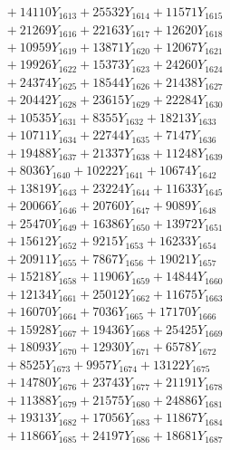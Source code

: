 \documentclass[a4paper,10pt]{article}
\begin{document}
{\begin{align}
&\;  + 14110 Y_{1613} + 25532 Y_{1614} + 11571 Y_{1615} \\[0.3ex]
&\;  + 21269 Y_{1616} + 22163 Y_{1617} + 12620 Y_{1618} \\[0.5ex]\allowbreak
&\;  + 10959 Y_{1619} + 13871 Y_{1620} + 12067 Y_{1621} \\[0.3ex]
&\;  + 19926 Y_{1622} + 15373 Y_{1623} + 24260 Y_{1624} \\[0.3ex]
&\;  + 24374 Y_{1625} + 18544 Y_{1626} + 21438 Y_{1627} \\[0.3ex]
&\;  + 20442 Y_{1628} + 23615 Y_{1629} + 22284 Y_{1630} \\[0.3ex]
&\;  + 10535 Y_{1631} + 8355 Y_{1632} + 18213 Y_{1633} \\[0.3ex]
&\;  + 10711 Y_{1634} + 22744 Y_{1635} + 7147 Y_{1636} \\[0.3ex]
&\;  + 19488 Y_{1637} + 21337 Y_{1638} + 11248 Y_{1639} \\[0.3ex]
&\;  + 8036 Y_{1640} + 10222 Y_{1641} + 10674 Y_{1642} \\[0.3ex]
&\;  + 13819 Y_{1643} + 23224 Y_{1644} + 11633 Y_{1645} \\[0.3ex]
&\;  + 20066 Y_{1646} + 20760 Y_{1647} + 9089 Y_{1648} \\[0.5ex]\allowbreak
&\;  + 25470 Y_{1649} + 16386 Y_{1650} + 13972 Y_{1651} \\[0.3ex]
&\;  + 15612 Y_{1652} + 9215 Y_{1653} + 16233 Y_{1654} \\[0.3ex]
&\;  + 20911 Y_{1655} + 7867 Y_{1656} + 19021 Y_{1657} \\[0.3ex]
&\;  + 15218 Y_{1658} + 11906 Y_{1659} + 14844 Y_{1660} \\[0.3ex]
&\;  + 12134 Y_{1661} + 25012 Y_{1662} + 11675 Y_{1663} \\[0.3ex]
&\;  + 16070 Y_{1664} + 7036 Y_{1665} + 17170 Y_{1666} \\[0.3ex]
&\;  + 15928 Y_{1667} + 19436 Y_{1668} + 25425 Y_{1669} \\[0.3ex]
&\;  + 18093 Y_{1670} + 12930 Y_{1671} + 6578 Y_{1672} \\[0.3ex]
&\;  + 8525 Y_{1673} + 9957 Y_{1674} + 13122 Y_{1675} \\[0.3ex]
&\;  + 14780 Y_{1676} + 23743 Y_{1677} + 21191 Y_{1678} \\[0.5ex]\allowbreak
&\;  + 11388 Y_{1679} + 21575 Y_{1680} + 24886 Y_{1681} \\[0.3ex]
&\;  + 19313 Y_{1682} + 17056 Y_{1683} + 11867 Y_{1684} \\[0.3ex]
&\;  + 11866 Y_{1685} + 24197 Y_{1686} + 18681 Y_{1687} \\[0.3ex]

\end{align}}
\end{document}

